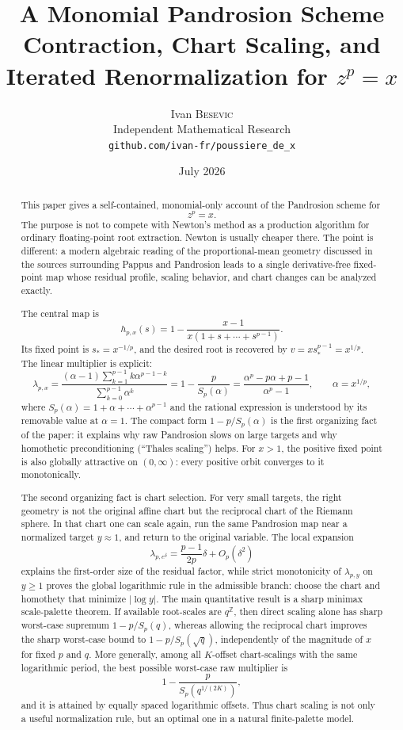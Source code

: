 \documentclass[10pt,a4paper]{article}
\title{\bfseries A Monomial Pandrosion Scheme\\[-0.1em]
\large Contraction, Chart Scaling, and Iterated Renormalization for $z^p=x$}
\author{Ivan \textsc{Besevic}\\[-0.2em]
\small Independent Mathematical Research\\[-0.2em]
\small \texttt{github.com/ivan-fr/poussiere\_de\_x}}
\date{July 2026}
\theoremstyle{plain}
\theoremstyle{definition}
\theoremstyle{remark}
\begin{document}
\maketitle

\begin{abstract}
This paper gives a self-contained, monomial-only account of the Pandrosion
scheme for
\[
  z^p=x.
\]
The purpose is not to compete with Newton's method as a production algorithm
for ordinary floating-point root extraction.  Newton is usually cheaper there.
The point is different: a modern algebraic reading of the proportional-mean
geometry discussed in the sources surrounding Pappus and Pandrosion leads to a
single derivative-free fixed-point map whose residual profile, scaling behavior,
and chart changes can be analyzed exactly.

The central map is
\[
  h_{p,x}(s)=1-\frac{x-1}{x(1+s+\cdots+s^{p-1})}.
\]
Its fixed point is $s_*=x^{-1/p}$, and the desired root is recovered by
$v=x s_*^{p-1}=x^{1/p}$.  The linear multiplier is explicit:
\[
  \lambda_{p,x}
  =\frac{(\alpha-1)\sum_{k=1}^{p-1}k\alpha^{p-1-k}}
         {\sum_{k=0}^{p-1}\alpha^k}
  =1-\frac{p}{S_p(\alpha)}
  =\frac{\alpha^p-p\alpha+p-1}{\alpha^p-1},
  \qquad \alpha=x^{1/p},
\]
where $S_p(\alpha)=1+\alpha+\cdots+\alpha^{p-1}$ and the rational expression is
understood by its removable value at $\alpha=1$.  The compact form
$1-p/S_p(\alpha)$ is the first organizing fact of the paper: it explains why
raw Pandrosion slows on large targets and why homothetic preconditioning
(``Thales scaling'') helps.
For $x>1$, the positive fixed point is also globally attractive on
$(0,\infty)$: every positive orbit converges to it monotonically.

The second organizing fact is chart selection.  For very small targets, the
right geometry is not the original affine chart but the reciprocal chart of the
Riemann sphere.  In that chart one can scale again, run the same Pandrosion map
near a normalized target $y\approx1$, and return to the original variable.  The
local expansion
\[
  \lambda_{p,e^\delta}=\frac{p-1}{2p}\delta+O_p(\delta^2)
\]
explains the first-order size of the residual factor, while strict monotonicity
of $\lambda_{p,y}$ on $y\ge1$ proves the global logarithmic rule in the
admissible branch: choose the chart and homothety that minimize $|\log y|$.
The main quantitative result is a sharp minimax scale-palette theorem.  If
available root-scales are $q^{\mathbb Z}$, then direct scaling alone has sharp
worst-case supremum $1-p/S_p(q)$, whereas allowing the reciprocal chart
improves the sharp worst-case bound to $1-p/S_p(\sqrt q)$, independently of
the magnitude of $x$ for fixed $p$ and $q$.  More generally, among all
$K$-offset chart-scalings with the same logarithmic period, the best possible
worst-case raw multiplier is
\[
  1-\frac{p}{S_p(q^{1/(2K)})},
\]
and it is attained by equally spaced logarithmic offsets.  Thus chart scaling is
not only a useful normalization rule, but an optimal one in a natural finite-palette
model.


\end{abstract}
\end{document}
